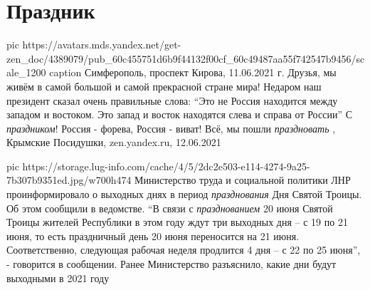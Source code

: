  
 
 
 
 
\chapter{Праздник}

\ifcmt
  pic https://avatars.mds.yandex.net/get-zen_doc/4389079/pub_60c455751d6b9f44132f00cf_60c49487aa55f742547b9456/scale_1200
	caption Симферополь, проспект Кирова, 11.06.2021 г.
\fi
Друзья, мы живём в самой большой и самой прекрасной стране мира!  Недаром наш
президент сказал очень правильные слова: \enquote{Это не Россия находится между
западом и востоком. Это запад и восток находятся слева и справа от России} С
\emph{праздником}! Россия - форева, Россия - виват! Всё, мы пошли
\emph{праздновать}
, 
Крымские Посидушки, zen.yandex.ru, 12.06.2021

\ifcmt
  pic https://storage.lug-info.com/cache/4/5/2dc2e503-e114-4274-9a25-7b307b9351ed.jpg/w700h474
\fi
Министерство труда и социальной политики ЛНР проинформировало о выходных днях в
период \emph{празднования} Дня Святой Троицы. Об этом сообщили в ведомстве.  \enquote{В связи
с \emph{празднованием} 20 июня Святой Троицы жителей Республики в этом году ждут три
выходных дня – с 19 по 21 июня, то есть праздничный день 20 июня переносится на
21 июня. Соответственно, следующая рабочая неделя продлится 4 дня – с 22 по 25
июня}, - говорится в сообщении.  Ранее Министерство разъяснило, какие дни будут
выходными в 2021 году
  


